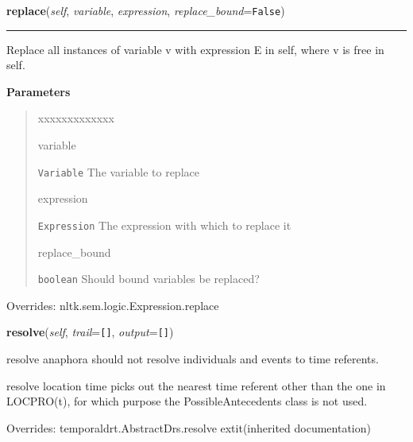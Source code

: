 \hspace{.8\funcindent}\begin{boxedminipage}{\funcwidth}

    \raggedright \textbf{replace}(\textit{self}, \textit{variable}, \textit{expression}, \textit{replace\_bound}={\tt False})

    \vspace{-1.5ex}

    \rule{\textwidth}{0.5\fboxrule}
\setlength{\parskip}{2ex}
    Replace all instances of variable v with expression E in self, where v 
    is free in self.

\setlength{\parskip}{1ex}
      \textbf{Parameters}
      \vspace{-1ex}

      \begin{quote}
        \begin{Ventry}{xxxxxxxxxxxxx}

          \item[variable]

          \texttt{Variable} The variable to replace

          \item[expression]

          \texttt{Expression} The expression with which to replace it

          \item[replace\_bound]

          \texttt{boolean} Should bound variables be replaced?

        \end{Ventry}

      \end{quote}

      Overrides: nltk.sem.logic.Expression.replace

    \end{boxedminipage}

    \vspace{0.5ex}

\hspace{.8\funcindent}\begin{boxedminipage}{\funcwidth}

    \raggedright \textbf{resolve}(\textit{self}, \textit{trail}={\tt \texttt{[}\texttt{]}}, \textit{output}={\tt \texttt{[}\texttt{]}})

\setlength{\parskip}{2ex}
    resolve anaphora should not resolve individuals and events to time 
    referents.

    resolve location time picks out the nearest time referent other than 
    the one in LOCPRO(t), for which purpose the PossibleAntecedents class 
    is not used.

\setlength{\parskip}{1ex}
      Overrides: temporaldrt.AbstractDrs.resolve 	extit{(inherited documentation)}

    \end{boxedminipage}

